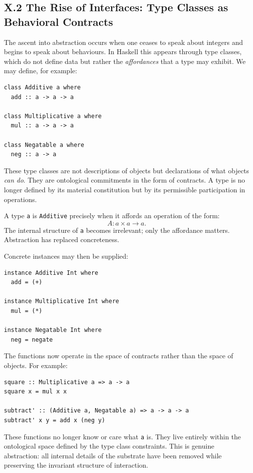 \documentclass[11pt,letterpaper]{article}
\begin{document}
\subsection{X.2 The Rise of Interfaces: Type Classes as Behavioral Contracts}

The ascent into abstraction occurs when one ceases to speak about integers and begins to speak about behaviours. In Haskell this appears through type classes, which do not define data but rather the \emph{affordances} that a type may exhibit. We may define, for example:

\begin{verbatim}
class Additive a where
  add :: a -> a -> a

class Multiplicative a where
  mul :: a -> a -> a

class Negatable a where
  neg :: a -> a
\end{verbatim}

These type classes are not descriptions of objects but declarations of what objects \emph{can do}. They are ontological commitments in the form of contracts. A type is no longer defined by its material constitution but by its permissible participation in operations.

A type \texttt{a} is \texttt{Additive} precisely when it affords an operation of the form:
\[
A : a \times a \to a.
\]
The internal structure of \texttt{a} becomes irrelevant; only the affordance matters. Abstraction has replaced concreteness.

Concrete instances may then be supplied:

\begin{verbatim}
instance Additive Int where
  add = (+)

instance Multiplicative Int where
  mul = (*)

instance Negatable Int where
  neg = negate
\end{verbatim}

The functions now operate in the space of contracts rather than the space of objects. For example:

\begin{verbatim}
square :: Multiplicative a => a -> a
square x = mul x x

subtract' :: (Additive a, Negatable a) => a -> a -> a
subtract' x y = add x (neg y)
\end{verbatim}

These functions no longer know or care what \texttt{a} is. They live entirely within the ontological space defined by the type class constraints. This is genuine abstraction: all internal details of the substrate have been removed while preserving the invariant structure of interaction.
\end{document}
